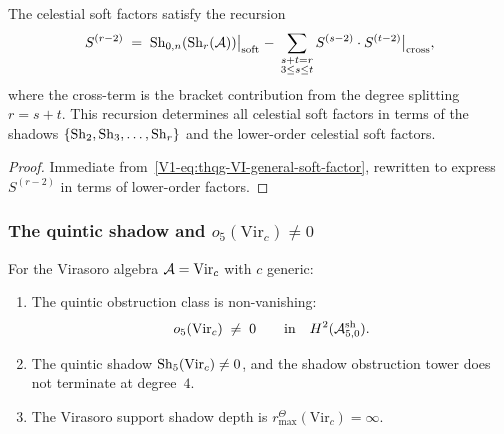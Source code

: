 \begin{corollary}
\label{cor:thqg-VI-soft-recursion}
The celestial soft factors satisfy the recursion
\begin{equation}%
S^{(r-2)}
\;=\;
\Sh_{0,n}(\Sh_r(\cA))\bigl|_{\text{soft}}
\;-\;
\sum_{\substack{s+t=r \\ 3 \leq s \leq t}}
S^{(s-2)} \cdot S^{(t-2)}\bigl|_{\text{cross}},
\end{equation}
where the cross-term is the bracket contribution from the degree
splitting $r = s + t$. This recursion determines all celestial soft factors
in terms of the shadows $\{\operatorname{Sh}_2, \operatorname{Sh}_3, \dotsc, \operatorname{Sh}_r\}$ and
the lower-order celestial soft factors.
\end{corollary}

\begin{proof}
Immediate from~\eqref{V1-eq:thqg-VI-general-soft-factor}, rewritten
to express $S^{(r-2)}$ in terms of lower-order factors.
\end{proof}

\subsubsection{The quintic shadow and $o_5(\mathrm{Vir}_c) \neq 0$}

\begin{theorem}
For the Virasoro algebra $\mathcal{A} = \mathrm{Vir}_c$ with $c$ generic:
\begin{enumerate}[label=\textup{(\roman*)}]
\item The quintic obstruction class is non-vanishing:
\begin{equation}%
o_5(\mathrm{Vir}_c) \;\neq\; 0
\qquad\text{in}\quad
H^2(\cA^{\mathrm{sh}}_{5,0}).
\end{equation}
\item The quintic shadow $\operatorname{Sh}_5(\mathrm{Vir}_c) \neq 0$, and
 the shadow obstruction tower does not terminate at degree~$4$.
\item The Virasoro support shadow depth is
\(r^\Theta_{\max}(\mathrm{Vir}_c)=\infty\).
\end{enumerate}
\end{theorem}

